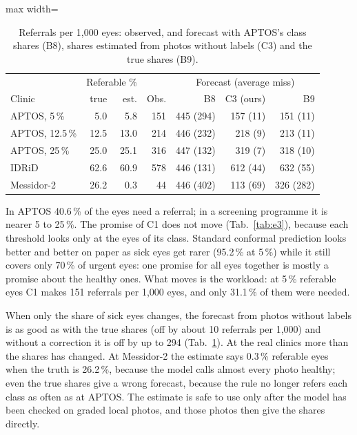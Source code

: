 \documentclass[10pt,twocolumn,letterpaper]{article}
\newcommand{\pct}{\,\%}
\begin{document}
\begin{table}[t]\centering\small
\begin{adjustbox}{max width=\linewidth}\begin{tabular}{@{}lrrrrrr@{}}\toprule
 & \multicolumn{2}{c}{Referable \%} & & \multicolumn{3}{c}{Forecast (average miss)}\\
Clinic & true & est. & Obs. & B8 & C3 (ours) & B9\\\midrule
APTOS, 5\pct & 5.0 & 5.8 & 151 & 445 (294) & 157 (11) & 151 (11)\\
APTOS, 12.5\pct & 12.5 & 13.0 & 214 & 446 (232) & 218 (9) & 213 (11)\\
APTOS, 25\pct & 25.0 & 25.1 & 316 & 447 (132) & 319 (7) & 318 (10)\\
IDRiD & 62.6 & 60.9 & 578 & 446 (131) & 612 (44) & 632 (55)\\
Messidor-2 & 26.2 & 0.3 & 44 & 446 (402) & 113 (69) & 326 (282)\\\bottomrule
\end{tabular}\end{adjustbox}
\caption{Referrals per 1,000 eyes: observed, and forecast with APTOS's class shares (B8), shares estimated from photos without labels (C3) and the true shares (B9).}\label{tab:c3}
\end{table}
In APTOS 40.6\pct{} of the eyes need a referral; in a screening programme it is nearer 5 to 25\pct. The promise of C1 does not move (Tab.~\ref{tab:e3}), because each threshold looks only at the eyes of its class. Standard conformal prediction looks better and better on paper as sick eyes get rarer (95.2\pct{} at 5\pct) while it still covers only 70\pct{} of urgent eyes: one promise for all eyes together is mostly a promise about the healthy ones. What moves is the workload: at 5\pct{} referable eyes C1 makes 151 referrals per 1,000 eyes, and only 31.1\pct{} of them were needed.

When only the share of sick eyes changes, the forecast from photos without labels is as good as with the true shares (off by about 10 referrals per 1,000) and without a correction it is off by up to 294 (Tab.~\ref{tab:c3}). At the real clinics more than the shares has changed. At Messidor-2 the estimate says 0.3\pct{} referable eyes when the truth is 26.2\pct, because the model calls almost every photo healthy; even the true shares give a wrong forecast, because the rule no longer refers each class as often as at APTOS. The estimate is safe to use only after the model has been checked on graded local photos, and those photos then give the shares directly.
\end{document}
